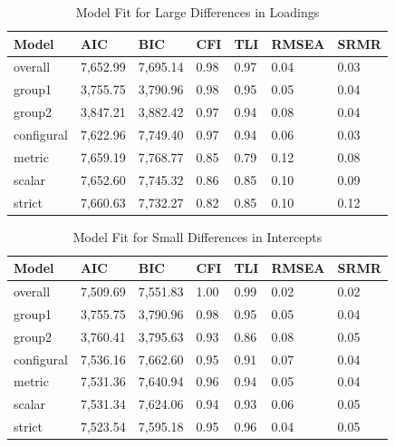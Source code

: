 \documentclass[
  man]{apa6}
\begin{document}
\begin{table}[tbp]

\begin{center}
\begin{threeparttable}

\caption{\label{tab:unnamed-chunk-4}Model Fit for Large Differences in Loadings}

\begin{tabular}{lllllll}
\toprule
Model & AIC & BIC & CFI & TLI & RMSEA & SRMR\\
\midrule
overall & 7,652.99 & 7,695.14 & 0.98 & 0.97 & 0.04 & 0.03\\
group1 & 3,755.75 & 3,790.96 & 0.98 & 0.95 & 0.05 & 0.04\\
group2 & 3,847.21 & 3,882.42 & 0.97 & 0.94 & 0.08 & 0.04\\
configural & 7,622.96 & 7,749.40 & 0.97 & 0.94 & 0.06 & 0.03\\
metric & 7,659.19 & 7,768.77 & 0.85 & 0.79 & 0.12 & 0.08\\
scalar & 7,652.60 & 7,745.32 & 0.86 & 0.85 & 0.10 & 0.09\\
strict & 7,660.63 & 7,732.27 & 0.82 & 0.85 & 0.10 & 0.12\\
\bottomrule
\end{tabular}

\end{threeparttable}
\end{center}

\end{table}

\begin{table}[tbp]

\begin{center}
\begin{threeparttable}

\caption{\label{tab:unnamed-chunk-5}Model Fit for Small Differences in Intercepts}

\begin{tabular}{lllllll}
\toprule
Model & AIC & BIC & CFI & TLI & RMSEA & SRMR\\
\midrule
overall & 7,509.69 & 7,551.83 & 1.00 & 0.99 & 0.02 & 0.02\\
group1 & 3,755.75 & 3,790.96 & 0.98 & 0.95 & 0.05 & 0.04\\
group2 & 3,760.41 & 3,795.63 & 0.93 & 0.86 & 0.08 & 0.05\\
configural & 7,536.16 & 7,662.60 & 0.95 & 0.91 & 0.07 & 0.04\\
metric & 7,531.36 & 7,640.94 & 0.96 & 0.94 & 0.05 & 0.04\\
scalar & 7,531.34 & 7,624.06 & 0.94 & 0.93 & 0.06 & 0.05\\
strict & 7,523.54 & 7,595.18 & 0.95 & 0.96 & 0.04 & 0.05\\
\bottomrule
\end{tabular}

\end{threeparttable}
\end{center}

\end{table}
\end{document}
